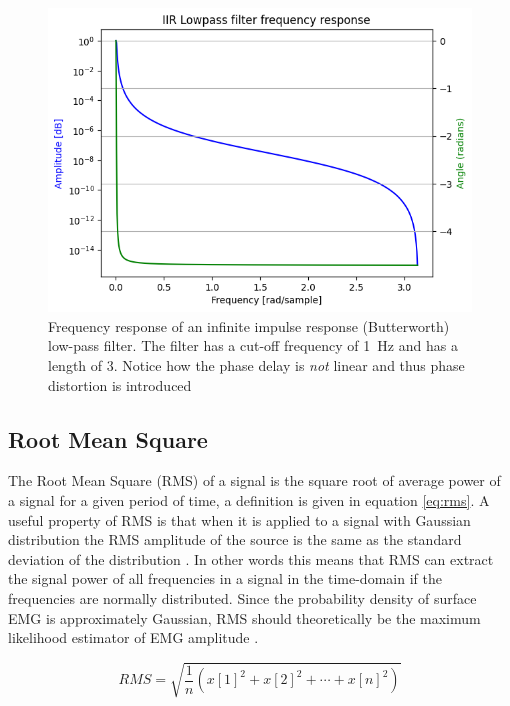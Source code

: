 \begin{figure}[h!t]
	\begin{center}
		\includegraphics[width=0.7\columnwidth]{images/iirfilter_phaseshift.png}
	\end{center}
	\caption{Frequency response of an infinite impulse response (Butterworth) low-pass filter. The filter has a cut-off frequency of \SI{1}{Hz} and has a length of 3. Notice how the phase delay is \textit{not} linear and thus phase distortion is introduced}
	\label{fig:iirfilter_phaseshift}
\end{figure}

\subsection{Root Mean Square}
The Root Mean Square (RMS) of a signal is the square root of average power of a signal for a given period of time, a definition is given in equation \ref{eq:rms}. A useful property of RMS is that when it is applied to a signal with Gaussian distribution the RMS amplitude of the source is the same as the standard deviation of the distribution \cite{rms_standard_deviation}. In other words this means that RMS can extract the signal power of all frequencies in a signal in the time-domain if the frequencies are normally distributed. Since the probability density of surface EMG is approximately Gaussian, RMS should theoretically be the maximum likelihood estimator of EMG amplitude \cite{semg_signals_analysis_and_applications}.

\begin{equation}
    RMS = \sqrt{\frac{1}{n} (x[1]^2 + x[2]^2 + \cdots + x[n]^2)}
    \label{eq:rms}
\end{equation}

